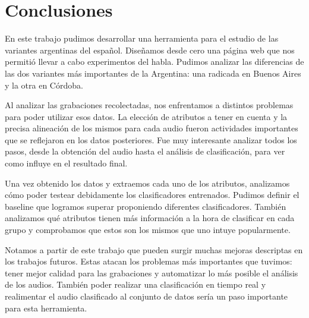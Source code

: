\chapter{Conclusiones}

En este trabajo pudimos desarrollar una herramienta para el estudio de las variantes argentinas del español. Diseñamos desde cero una página web que nos permitió llevar a cabo experimentos del habla. Pudimos analizar las diferencias  de las dos variantes más importantes de la Argentina: una radicada en Buenos Aires y la otra en Córdoba. 

Al analizar las grabaciones recolectadas, nos enfrentamos a distintos problemas para poder utilizar esos datos. La elección de atributos a tener en cuenta y la precisa alineación de los mismos para cada audio fueron actividades importantes que se reflejaron en los datos posteriores. Fue muy interesante analizar todos los pasos, desde la obtención del audio hasta el análisis de clasificación, para ver como influye en el resultado final.

Una vez obtenido los datos y extraemos cada uno de los atributos, analizamos cómo poder testear debidamente los clasificadores entrenados. Pudimos definir el baseline que logramos superar proponiendo diferentes clasificadores. También analizamos qué atributos tienen más información a la hora de clasificar en cada grupo y comprobamos que estos son los mismos que uno intuye popularmente.

Notamos a partir de este trabajo que pueden surgir muchas mejoras descriptas en los trabajos futuros. Estas atacan los problemas más importantes que tuvimos: tener mejor calidad para las grabaciones y automatizar lo más posible el análisis de los audios. También poder realizar una clasificación en tiempo real y realimentar el audio clasificado al conjunto de datos sería un paso importante para esta herramienta. 
